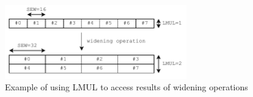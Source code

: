 \begin{figure}
    \centering
    \includegraphics[width=0.7\textwidth]{Figures/RVV_LMUL_Widening.pdf}
    \caption{Example of using LMUL to access results of widening operations}
    \label{fig:RVV_LMUL_widening}
\end{figure}